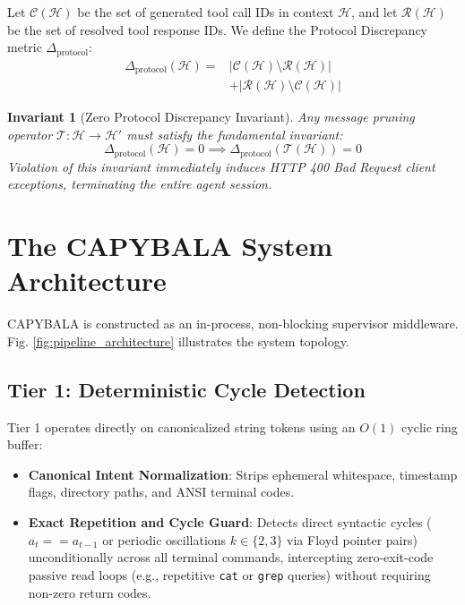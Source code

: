 \documentclass[journal]{IEEEtran}
\newtheorem{invariant}{Invariant}
\begin{document}
Let $\mathcal{C}(\mathcal{H})$ be the set of generated tool call IDs in context $\mathcal{H}$, and let $\mathcal{R}(\mathcal{H})$ be the set of resolved tool response IDs. We define the Protocol Discrepancy metric $\Delta_{\text{protocol}}$:
\begin{equation}
\begin{split}
\Delta_{\text{protocol}}(\mathcal{H}) ={} & |\mathcal{C}(\mathcal{H}) \setminus \mathcal{R}(\mathcal{H})| \\
& + |\mathcal{R}(\mathcal{H}) \setminus \mathcal{C}(\mathcal{H})|
\end{split}
\end{equation}

\begin{invariant}[Zero Protocol Discrepancy Invariant]
Any message pruning operator $\mathcal{T}: \mathcal{H} \to \mathcal{H}'$ must satisfy the fundamental invariant:
\begin{equation}
\Delta_{\text{protocol}}(\mathcal{H}) = 0 \implies \Delta_{\text{protocol}}(\mathcal{T}(\mathcal{H})) = 0
\end{equation}
Violation of this invariant immediately induces HTTP 400 Bad Request client exceptions, terminating the entire agent session.
\end{invariant}

\section{The CAPYBALA System Architecture}

CAPYBALA is constructed as an in-process, non-blocking supervisor middleware. Fig. \ref{fig:pipeline_architecture} illustrates the system topology.

\subsection{Tier 1: Deterministic Cycle Detection}
Tier 1 operates directly on canonicalized string tokens using an $O(1)$ cyclic ring buffer:
\begin{itemize}[leftmargin=12pt, topsep=2pt, itemsep=1pt]
    \item \textbf{Canonical Intent Normalization}: Strips ephemeral whitespace, timestamp flags, directory paths, and ANSI terminal codes.
    \item \textbf{Exact Repetition and Cycle Guard}: Detects direct syntactic cycles ($a_t == a_{t-1}$ or periodic oscillations $k \in \{2, 3\}$ via Floyd pointer pairs) unconditionally across all terminal commands, intercepting zero-exit-code passive read loops (e.g., repetitive \texttt{cat} or \texttt{grep} queries) without requiring non-zero return codes.
\end{itemize}
\end{document}
